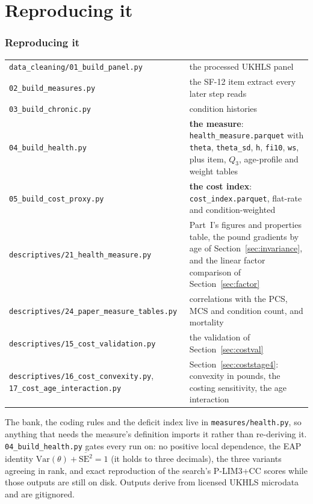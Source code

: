 \documentclass[11pt]{article}
\newcommand{\code}[1]{\texttt{\small #1}}
\begin{document}
\part*{Reproducing it}
\section{Reproducing it}

\begin{center}\small
\begin{tabular}{p{7.1cm}p{7.6cm}}
\toprule
\code{data\_cleaning/01\_build\_panel.py} & the processed UKHLS panel \\
\code{02\_build\_measures.py} & the SF-12 item extract every later step reads \\
\code{03\_build\_chronic.py} & condition histories \\
\code{04\_build\_health.py} & \textbf{the measure}: \code{health\_measure.parquet} with \code{theta}, \code{theta\_sd}, \code{h}, \code{fi10}, \code{ws}, plus item, $Q_3$, age-profile and weight tables \\
\code{05\_build\_cost\_proxy.py} & \textbf{the cost index}: \code{cost\_index.parquet}, flat-rate and condition-weighted \\
\code{descriptives/21\_health\_measure.py} & Part~I's figures and properties table, the pound gradients by age of Section~\ref{sec:invariance}, and the linear factor comparison of Section~\ref{sec:factor} \\
\code{descriptives/24\_paper\_measure\_tables.py} & correlations with the PCS, MCS and condition count, and mortality \\
\code{descriptives/15\_cost\_validation.py} & the validation of Section~\ref{sec:costval} \\
\code{descriptives/16\_cost\_convexity.py}, \code{17\_cost\_age\_interaction.py} & Section~\ref{sec:coststage4}: convexity in pounds, the costing sensitivity, the age interaction \\
\bottomrule
\end{tabular}
\end{center}

The bank, the coding rules and the deficit index live in
\code{measures/health.py}, so anything that needs the measure's definition
imports it rather than re-deriving it. \code{04\_build\_health.py} gates every
run on: no positive local dependence, the EAP identity
$\mathrm{Var}(\theta) + \overline{\mathrm{SE}^2} = 1$ (it holds to three
decimals), the three variants agreeing in rank, and exact reproduction of the
search's P-LIM3+CC scores while those outputs are still on disk. Outputs derive
from licensed UKHLS microdata and are gitignored.
\end{document}
